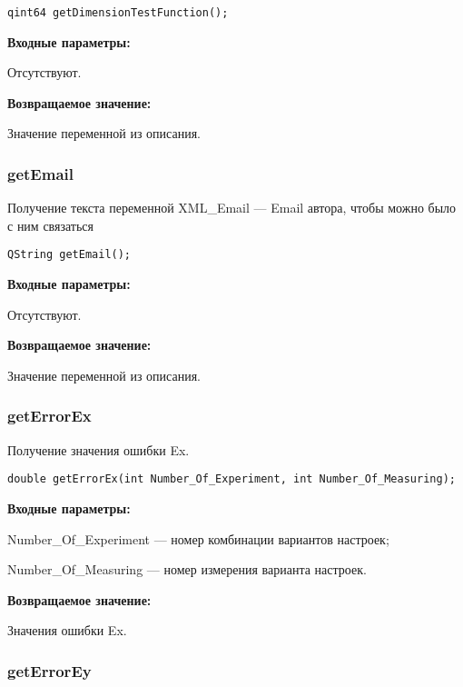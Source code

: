 \documentclass[a4paper,12pt]{article}
\begin{document}
\begin{lstlisting}[label=code_syntax_getDimensionTestFunction,caption=Синтаксис]
qint64 getDimensionTestFunction();
\end{lstlisting}

\textbf{Входные параметры:}

Отсутствуют.

\textbf{Возвращаемое значение:}

Значение переменной из описания.


\subsubsection{getEmail}\label{getEmail}

Получение текста переменной  XML\_Email --- Email автора, чтобы можно было с ним связаться


\begin{lstlisting}[label=code_syntax_getEmail,caption=Синтаксис]
QString getEmail();
\end{lstlisting}

\textbf{Входные параметры:}

Отсутствуют.

\textbf{Возвращаемое значение:}

Значение переменной из описания.


\subsubsection{getErrorEx}\label{getErrorEx}

Получение значения ошибки Ex.


\begin{lstlisting}[label=code_syntax_getErrorEx,caption=Синтаксис]
double getErrorEx(int Number_Of_Experiment, int Number_Of_Measuring);
\end{lstlisting}

\textbf{Входные параметры:}

Number\_Of\_Experiment --- номер комбинации вариантов настроек;
 
    Number\_Of\_Measuring --- номер измерения варианта настроек.

\textbf{Возвращаемое значение:}

Значения ошибки Ex.


\subsubsection{getErrorEy}\label{getErrorEy}
\end{document}

